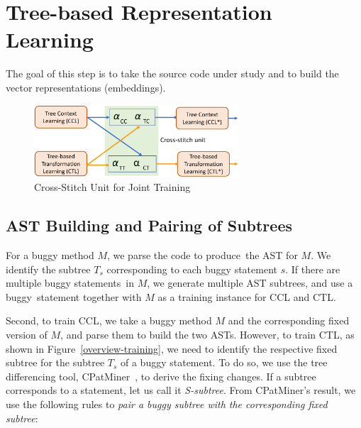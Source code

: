 \section{Tree-based Representation Learning}


The goal of this step is to take the source code under study and to
build the vector representations (embeddings).

\begin{figure}[t]
	\centering
	\includegraphics[width=3in]{graphs/cross-stitch}
        \vspace{-3pt}
	\caption{Cross-Stitch Unit for Joint Training~\cite{misra2016cross}}
	\label{fig:cross-stitch}
\end{figure}


\subsection{AST Building and Pairing of Subtrees}

For a buggy method $M$, we parse the code to produce~the AST for
$M$. We identify the subtree $T_s$ corresponding to each buggy
statement $s$. If there are multiple buggy statements~in $M$, we
generate multiple AST subtrees, and use a buggy~statement
together with $M$ as a training instance for CCL and CTL.

Second, to train CCL, we take a buggy method $M$ and the corresponding
fixed version of $M$, and parse them to build the two ASTs.
%
However, to train CTL, as shown in Figure~\ref{overview-training}, we
need to identify the respective fixed subtree for the subtree $T_s$ of
a buggy statement. To do so, we use the tree differencing tool,
CPatMiner~\cite{nguyen2019graph}, to derive the fixing changes. If a
subtree corresponds to a statement, let us call it {\em
  S-subtree}. From CPatMiner's result, we use the following rules to
{\em pair a buggy subtree with the corresponding fixed subtree}:

